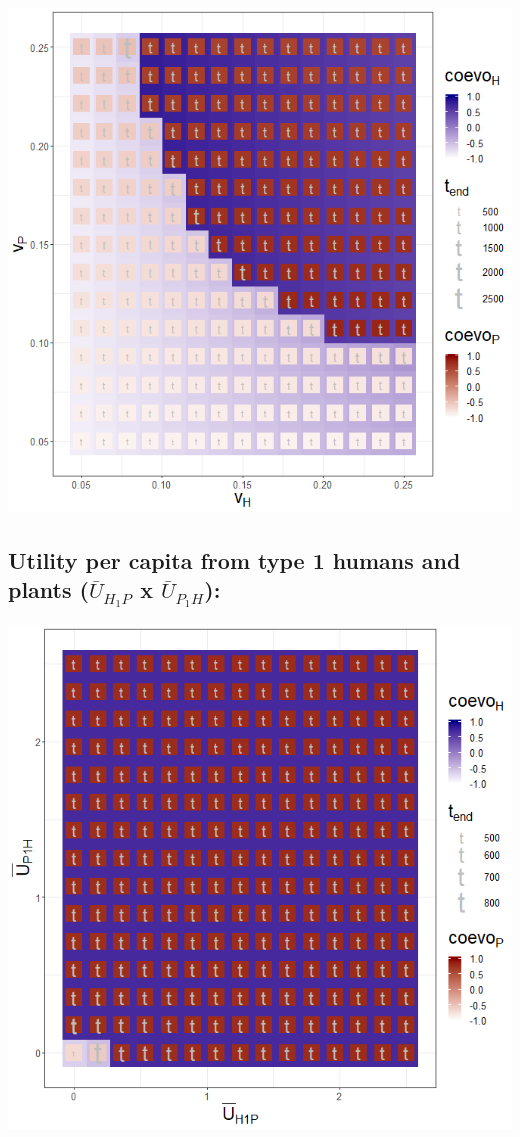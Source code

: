 \documentclass[]{book}
\begin{document}
\includegraphics[width=1\linewidth]{plots/3_twoPar-v.H-v.P_plot}

\newpage

\hypertarget{utility-per-capita-from-type-1-humans-and-plants-baru_h_1p-x-baru_p_1h}{%
\subsection{\texorpdfstring{Utility per capita from type 1 humans and plants (\(\bar{U}_{H_{1}P}\) x \(\bar{U}_{P_{1}H}\)):}{Utility per capita from type 1 humans and plants (\textbackslash{}bar\{U\}\_\{H\_\{1\}P\} x \textbackslash{}bar\{U\}\_\{P\_\{1\}H\}):}}\label{utility-per-capita-from-type-1-humans-and-plants-baru_h_1p-x-baru_p_1h}}

\includegraphics[width=1\linewidth]{plots/3_twoPar-mU.H1P-mU.P1H_plot}
\end{document}

